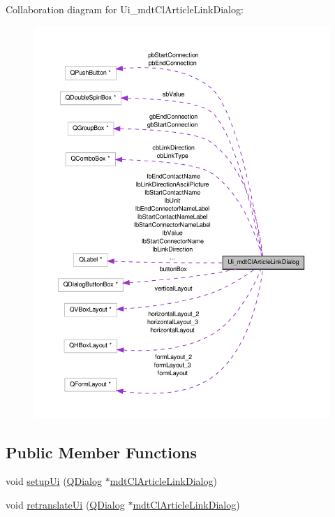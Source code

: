 Collaboration diagram for Ui\-\_\-mdt\-Cl\-Article\-Link\-Dialog\-:\nopagebreak
\begin{figure}[H]
\begin{center}
\leavevmode
\includegraphics[width=350pt]{class_ui__mdt_cl_article_link_dialog__coll__graph}
\end{center}
\end{figure}
\subsection*{Public Member Functions}
\begin{DoxyCompactItemize}
\item 
void \hyperlink{class_ui__mdt_cl_article_link_dialog_ade2eec293670997759449026eab49152}{setup\-Ui} (\hyperlink{class_q_dialog}{Q\-Dialog} $\ast$\hyperlink{classmdt_cl_article_link_dialog}{mdt\-Cl\-Article\-Link\-Dialog})
\item 
void \hyperlink{class_ui__mdt_cl_article_link_dialog_a5c4764ae500c259fa03c703f9c8ea884}{retranslate\-Ui} (\hyperlink{class_q_dialog}{Q\-Dialog} $\ast$\hyperlink{classmdt_cl_article_link_dialog}{mdt\-Cl\-Article\-Link\-Dialog})
\end{DoxyCompactItemize}
